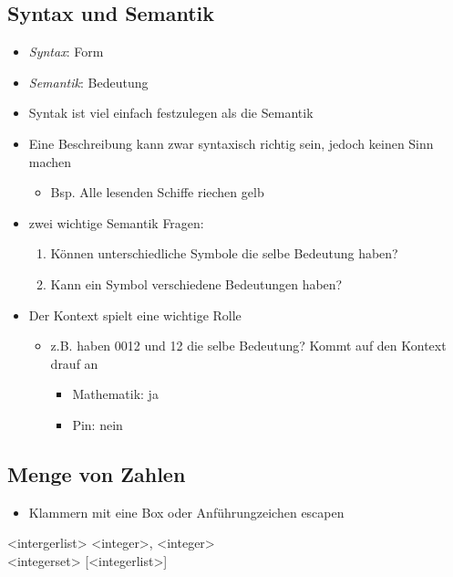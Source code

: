 \documentclass[11pt]{article}
\begin{document}
\subsection{Syntax und Semantik}
\label{sec:orgb6965ad}
\begin{itemize}
\item \emph{Syntax}: Form\\
\item \emph{Semantik}: Bedeutung\\

\item Syntak ist viel einfach festzulegen als die Semantik\\
\item Eine Beschreibung kann zwar syntaxisch richtig sein, jedoch keinen Sinn machen\\
\begin{itemize}
\item Bsp. Alle lesenden Schiffe riechen gelb\\
\end{itemize}

\item zwei wichtige Semantik Fragen:\\
\begin{enumerate}
\item Können unterschiedliche Symbole die selbe Bedeutung haben?\\
\item Kann ein Symbol verschiedene Bedeutungen haben?\\
\end{enumerate}
\item Der Kontext spielt eine wichtige Rolle\\
\begin{itemize}
\item z.B. haben 0012 und 12 die selbe Bedeutung? Kommt auf den Kontext drauf an\\
\begin{itemize}
\item Mathematik: ja\\
\item Pin: nein\\
\end{itemize}
\end{itemize}
\end{itemize}

\subsection{Menge von Zahlen}
\label{sec:org098f235}
\begin{itemize}
\item Klammern mit eine Box oder Anführungzeichen escapen\\
\end{itemize}
<intergerlist> \Leftarrow <integer>{, <integer>}\\
<integerset> \Leftarrow \boxed{\{}[<integerlist>]\boxed{\}}
\end{document}
